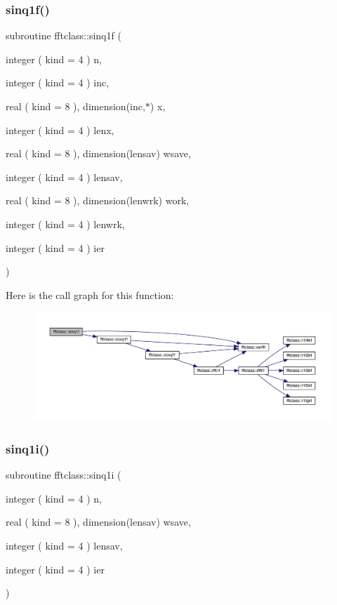 \subsubsection{\texorpdfstring{sinq1f()}{sinq1f()}}
{\footnotesize\ttfamily subroutine fftclass\+::sinq1f (\begin{DoxyParamCaption}\item[{integer ( kind = 4 )}]{n,  }\item[{integer ( kind = 4 )}]{inc,  }\item[{real ( kind = 8 ), dimension(inc,$\ast$)}]{x,  }\item[{integer ( kind = 4 )}]{lenx,  }\item[{real ( kind = 8 ), dimension(lensav)}]{wsave,  }\item[{integer ( kind = 4 )}]{lensav,  }\item[{real ( kind = 8 ), dimension(lenwrk)}]{work,  }\item[{integer ( kind = 4 )}]{lenwrk,  }\item[{integer ( kind = 4 )}]{ier }\end{DoxyParamCaption})}

Here is the call graph for this function\+:\nopagebreak
\begin{figure}[H]
\begin{center}
\leavevmode
\includegraphics[width=350pt]{namespacefftclass_a205d9dc43dfb082cdee420a4ae2fb269_cgraph}
\end{center}
\end{figure}
\mbox{\label{namespacefftclass_aa0d2ffdfc38a79ecd1b47de75f3d1084}} 
\subsubsection{\texorpdfstring{sinq1i()}{sinq1i()}}
{\footnotesize\ttfamily subroutine fftclass\+::sinq1i (\begin{DoxyParamCaption}\item[{integer ( kind = 4 )}]{n,  }\item[{real ( kind = 8 ), dimension(lensav)}]{wsave,  }\item[{integer ( kind = 4 )}]{lensav,  }\item[{integer ( kind = 4 )}]{ier }\end{DoxyParamCaption})}

